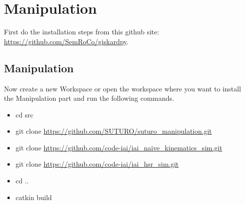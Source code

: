 \documentclass[main.tex]{subfiles}
\begin{document}
\section{Manipulation}

First do the installation steps from this github site:\\
	\url{https://github.com/SemRoCo/giskardpy}.\\
	
	\subsection{Manipulation}
Now create a new Workspace or open the workspace where you want to install the Manipulation part and run the following commands.	
\begin{itemize}
\item cd src
\item git clone \url{https://github.com/SUTURO/suturo_manipulation.git}
\item git clone \url{https://github.com/code-iai/iai_naive_kinematics_sim.git}
\item git clone \url{https://github.com/code-iai/iai_hsr_sim.git}
\item cd ..
\item catkin build  
\end{itemize}
	
	
\end{document}
